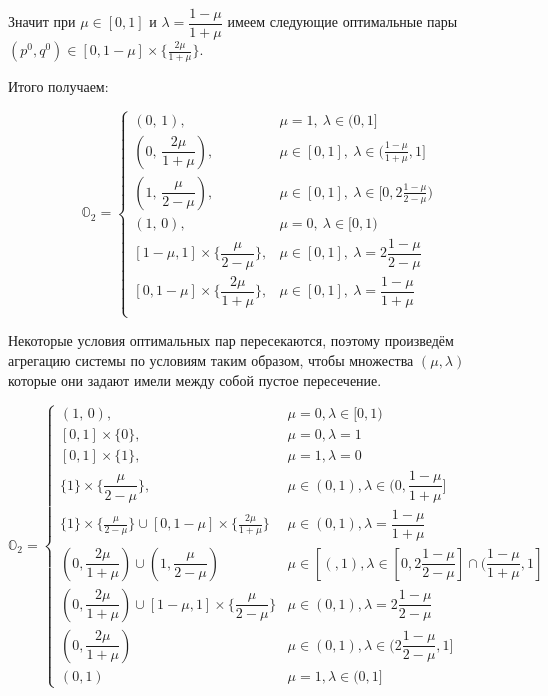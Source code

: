 Значит при $\mu \in [0, 1]$ и $\lambda = \dfrac{1-\mu}{1+\mu}$
имеем следующие оптимальные пары
$(p^0, q^0) \in [0, 1 - \mu] \times \{\frac{2\mu}{1 + \mu}\}$.

Итого получаем:

$$
	\mathbb{O}_2 =
	\begin{cases}
		(0, \, 1), & \mu = 1, \: \lambda \in (0,1] 
		\\
		(0, \, \dfrac{2\mu}{1 + \mu}), & 
		\mu \in [0, 1], \: \lambda \in (\frac{1-\mu}{1+\mu}, 1]
		\\
		(1, \, \dfrac{\mu}{2 - \mu}), & 
		\mu \in [0, 1], \: \lambda \in [0, 2\frac{1-\mu}{2-\mu})
		\\
		(1, \, 0), & \mu=0, \: \lambda \in [0, 1)
		\\
		[1 - \mu, 1] \times  \Big\{ \dfrac{\mu}{2 - \mu}\Big\}, &
		\mu \in [0, 1], \: \lambda = 2\dfrac{1 - \mu}{2 - \mu}	
		\\
		[0, 1 - \mu] \times \Big\{\dfrac{2\mu}{1 + \mu}\Big\}, &
		\mu \in [0, 1], \: \lambda = \dfrac{1-\mu}{1+\mu}
		\\
	\end{cases}
$$

Некоторые условия оптимальных пар пересекаются, поэтому 
произведём агрегацию системы по условиям таким образом, чтобы
множества $(\mu, \lambda)$ которые они задают имели между собой
пустое пересечение.

$$
	\mathbb{O}_2 =
	\begin{cases}
		(1, \, 0), & \mu = 0, \lambda \in [0, 1) 
		\\
		[0, 1] \times \{0\}, & 
		\mu=0, \lambda =1
		\\
		[0, 1] \times \{1\}, &
		\mu = 1, \lambda = 0
		\\
		\{1\} \times \{\dfrac{\mu}{2-\mu}\}, &
		\mu \in (0,1), \lambda \in (0, \dfrac{1 - \mu}{1 + \mu}]
		\\
		\{1\} \times \{\frac{\mu}{2-\mu}\} \cup
		[0,1-\mu] \times \{\frac{2\mu}{1+\mu}\} &
		\mu \in (0,1), \lambda = \dfrac{1-\mu}{1+\mu}
		\\
		(0, \dfrac{2\mu}{1 + \mu}) \cup
		(1, \dfrac{\mu}{2 - \mu}) &
		\mu \in [(, 1), \lambda \in 
		[0, 2\dfrac{1 - \mu}{2 - \mu}] \cap (\dfrac{1 - \mu}{1 + \mu}, 	1]
		\\
		(0, \dfrac{2\mu}{1+\mu}) \cup
		[1 - \mu, 1] \times \{\dfrac{\mu}{2 - \mu}\} &
		\mu \in (0, 1), \lambda = 2\dfrac{1 - \mu}{2 - \mu}
		\\
		(0, \dfrac{2\mu}{1 + \mu}) &
		\mu \in (0, 1), \lambda \in (2\dfrac{1 - \mu}{2 - \mu}, 1]
		\\
		(0, 1) & \mu = 1, \lambda \in (0, 1] 	
	\end{cases}
$$

